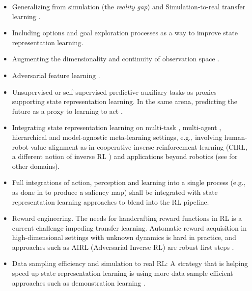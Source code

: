 \documentclass[a4paper]{article}
\newcommand{\tim}[1]{\todo[color=yellow!60,inline]{#1}}
\begin{document}
\begin{itemize}
\item Generalizing from simulation \cite{Peng17} (the \textit{reality gap}) and  Simulation-to-real transfer learning \cite{Tobin17,Peng17}.
\item Including options \cite{Machado17a} and goal exploration processes \cite{Forestier17} as a way to improve state representation learning.
\item Augmenting the dimensionality and continuity of observation space \cite{Lesort17}.
\item Adversarial feature learning \cite{Donahue16, Fu17}.
\item Unsupervised \cite{Jaderberg16} or self-supervised predictive \cite{Shelhamer17} auxiliary tasks as proxies supporting state representation learning. In the same arena, predicting the future as a proxy to learning to act \cite{Dosovitskiy16, Oh17}.
\item Integrating state representation learning on multi-task \cite{Kulkarni16, Andreas17, Wilson07,Teh17}, multi-agent \cite{Foerster16,Foerster17}, hierarchical \cite{Wilson07} and model-agnostic meta-learning \cite{Finn17Model} settings, e.g., involving human-robot value alignment as in cooperative inverse reinforcement learning (CIRL, a different notion of inverse RL \cite{Hadfield16}) and applications beyond robotics (see \cite{Li17,Kaelbling96} for other domains).
\item Full integrations of action, perception and learning into a single process (e.g., as done in \cite{LeGoff17} to produce a saliency map) shall be integrated with state representation learning  approaches to blend into the RL pipeline.

\item Reward engineering. The needs for handcrafting reward functions in RL is a current challenge impeding transfer learning. Automatic reward acquisition in high-dimensional settings with unknown dynamics is hard in practice, and approaches such as AIRL (Adversarial Inverse RL) are robust first steps \cite{Fu17}.

\item Data sampling efficiency and simulation to real RL: A strategy that is helping speed up state representation learning is using more data sample efficient approaches such as demonstration learning \cite{Hester17}.


\end{itemize}
\end{document}

